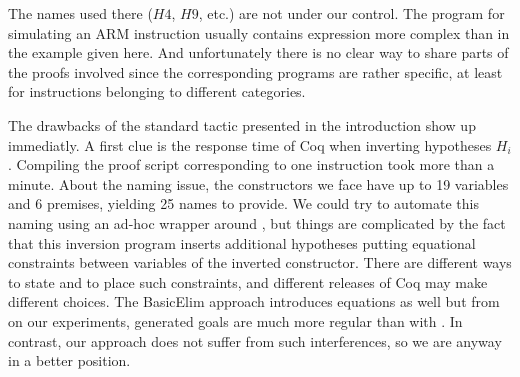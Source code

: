 \medskip
{}
\medskip

\noindent
The names used there ($H4$, $H9$, etc.) are not under our control.
The program for simulating an ARM
instruction usually contains expression more complex than in the
example given here.
And unfortunately there is no clear way to share parts of the proofs
involved since the corresponding programs are rather specific,
at least for instructions belonging to different categories.

The drawbacks of the standard tactic \inversion presented
in the introduction show up immediatly.
%
A first clue is the response time of Coq when inverting hypotheses $H_i$.
Compiling the proof script corresponding to one instruction
took more than a minute.
%
%
%
%
About the naming issue, 
the constructors we face have up to 19 variables and 6 premises,
yielding 25 names to provide.
We could try to automate this naming using an ad-hoc wrapper 
around \inversion, 
but things are complicated by 
the fact that this inversion program inserts
additional hypotheses putting equational constraints 
between variables of the inverted constructor.
There are different ways to state and to place such constraints,
and different releases of Coq may make different choices.
The BasicElim approach introduces equations as well
but from on our experiments, 
generated goals are much more regular than with \inversion.
In contrast, 
our approach does not suffer from such interferences,
so we are anyway in a better position. 

